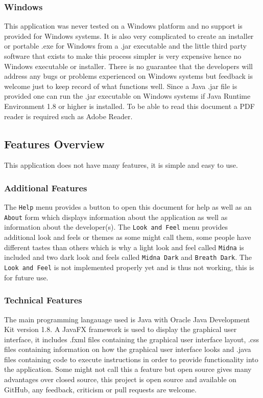 \documentclass[11pt]{article}
\newcommand{\code}[1]{\texttt{#1}}
\begin{document}
			\subsubsection{Windows}
				This application was never tested on a Windows platform and no support is provided for Windows systems. It is also very complicated to create an installer or portable .exe for Windows from a .jar executable and the little third party software that exists to make this process simpler is very expensive hence no Windows executable or installer. There is no guarantee that the developers will address any bugs or problems experienced on Windows systems but feedback is welcome just to keep record of what functions well. Since a Java .jar file is provided one can run the .jar executable on Windows systems if Java Runtime Environment 1.8 or higher is installed. To be able to read this document a PDF reader is required such as Adobe Reader.

		\subsection{Features Overview}
			This application does not have many features, it is simple and easy to use.

			\subsubsection{Additional Features}
				The \code{Help} menu provides a button to open this document for help as well as an \code{About} form which displays information about the application as well as information about the developer(s). The \code{Look and Feel} menu provides additional look and feels or themes as some might call them, some people have different tastes than others which is why a light look and feel called \code{Midna} is included and two dark look and feels called \code{Midna Dark} and \code{Breath Dark}. The \code{Look and Feel} is not implemented properly yet and is thus not working, this is for future use.

			\subsubsection{Technical Features}
				The main programming langauage used is Java with Oracle Java Development Kit version 1.8. A JavaFX framework is used to display the graphical user interface, it includes .fxml files containing the graphical user interface layout, .css files containing information on how the graphical user interface looks and .java files containing code to execute instructions in order to provide functionality into the application. Some might not call this a feature but open source gives many advantages over closed source, this project is open source and available on GitHub, any feedback, criticism or pull requests are welcome.
\end{document}
